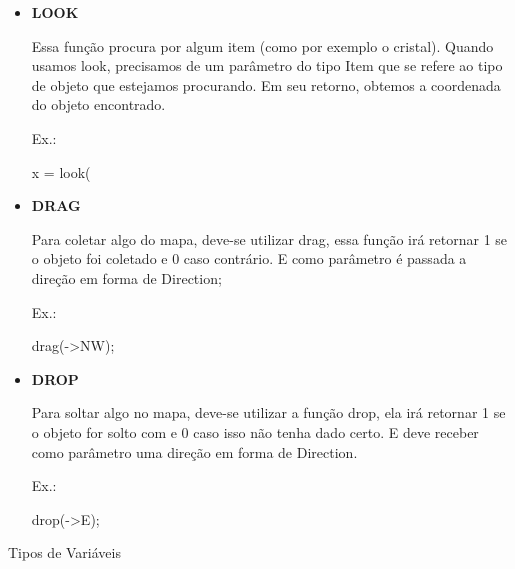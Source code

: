 \documentclass[a4paper]{article}
\begin{document}
{{{{{\begin{itemize}
            \textcolor{NavyBlue}{Ex.:}
            
            fire([12,15]);

        \bigskip
        
        \item \textbf{LOOK}
        
            Essa função procura por algum item (como por exemplo
            o cristal).
            Quando usamos 
            \textcolor{NavyBlue}{look},
            precisamos de um parâmetro do tipo Item que se refere
            ao tipo de objeto que estejamos procurando.
            Em seu retorno, obtemos a coordenada do objeto encontrado.

            \textcolor{NavyBlue}{Ex.:}
            
            x = look( %
        
        \bigskip
        
        \item \textbf{DRAG}
        
            Para coletar algo do mapa, deve-se utilizar
            \textcolor{NavyBlue}{drag},
            essa função irá retornar 1 se o objeto foi
            coletado e 0 caso contrário.
            E como parâmetro é passada a direção em forma
            de Direction;

            \textcolor{NavyBlue}{Ex.:}
            
            drag(->NW);

        \bigskip
                
        \item \textbf{DROP}
        
            Para soltar algo no mapa, deve-se utilizar 
            a função
            \textcolor{NavyBlue}{drop},
            ela irá retornar 1 se o objeto for solto com
            e 0 caso isso não tenha dado certo.
            E deve receber como parâmetro uma direção
            em forma de Direction.

            \textcolor{NavyBlue}{Ex.:}
            
            drop(->E);
            
        \end{itemize}

\newpage %


{\textcolor{NavyBlue}{\LARGE Tipos de Variáveis}

    \bigskip
    \bigskip
    
}}}}}}
\end{document}
